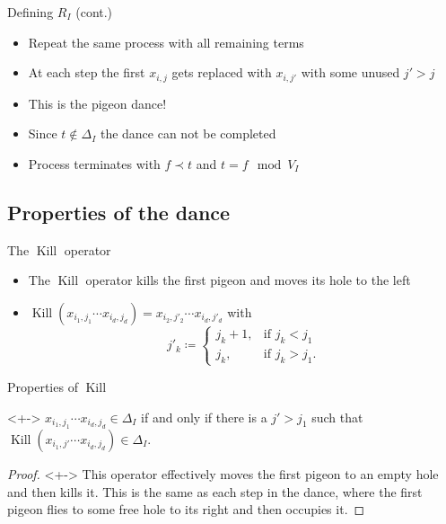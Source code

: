 \documentclass[xcolor={dvipsnames}]{beamer}
\renewcommand{\K}{\operatorname{Kill}}
\begin{document}
\begin{frame}{Defining $R_I$ (cont.)}
    \begin{itemize}[<+->]
        \item Repeat the same process with all remaining terms
        \item At each step the first $x_{i, j}$ gets replaced with $x_{i, j'}$ with some unused $j' > j$
        \item This is the pigeon dance!
        \item Since $t \not\in \Delta_I$ the dance can not be completed
        \item Process terminates with $f \prec t$ and $t = f \mod V_I$
    \end{itemize}
\end{frame}

\subsection{Properties of the dance}
\begin{frame}{The $\K$ operator}
    \begin{itemize}[<+->]
        \item The $\K$ operator kills the first pigeon and moves its hole to the left
        \item $\K(x_{i_1, j_1} \cdots x_{i_d, j_d}) = x_{i_2, j'_2} \cdots x_{i_d, j'_d}$ with\\
            $$j'_k \coloneqq \begin{cases}
                    j_k + 1, &\text{if } j_k < j_1\\
                    j_k, &\text{if } j_k > j_1.
                \end{cases}$$
    \end{itemize}
\end{frame}

\begin{frame}{Properties of $\K$}
    \begin{theorem}<+->
        $x_{i_1, j_1} \cdots x_{i_d, j_d} \in \Delta_I$ if and only if there is a $j' > j_1$ such that $\K(x_{i_1, j'} \cdots x_{i_d, j_d}) \in \Delta_I$.
    \end{theorem}
    \begin{proof}[Proof\nopunct]<+->
        This operator effectively moves the first pigeon to an empty hole and then kills it. This is the same as each step in the dance, where the first pigeon flies to some free hole to its right and then occupies it.
    \end{proof}
\end{frame}
\end{document}
